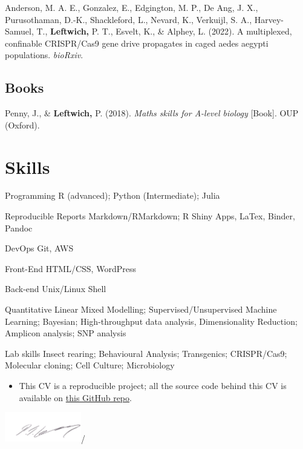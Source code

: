 \documentclass[11pt, a4paper]{awesome-cv}
\providecommand{\tightlist}{%
	\setlength{\itemsep}{0pt}\setlength{\parskip}{0pt}}
\begin{document}
\leavevmode\hypertarget{ref-1}{}%
Anderson, M. A. E., Gonzalez, E., Edgington, M. P., De Ang, J. X.,
Purusothaman, D.-K., Shackleford, L., Nevard, K., Verkuijl, S. A.,
Harvey-Samuel, T., \textbf{Leftwich,} P. T., Esvelt, K., \& Alphey, L.
(2022). A multiplexed, confinable CRISPR/Cas9 gene drive propagates in
caged aedes aegypti populations. \emph{bioRxiv}.

\endgroup

\hypertarget{books}{%
\subsection{Books}\label{books}}

\begingroup
\setlength{\parindent}{0.2in}

\hypertarget{refs_proceedings}{}
\leavevmode\hypertarget{ref-1}{}%
Penny, J., \& \textbf{Leftwich,} P. (2018). \emph{Maths skills for
{A-level} biology} {[}Book{]}. OUP (Oxford).

\endgroup

\newpage

\hypertarget{skills}{%
\section{Skills}\label{skills}}

\begin{cvskills}
  \cvskill
    {Programming}
    {R (advanced); Python (Intermediate); Julia}
    
  \cvskill
    {Reproducible Reports}
    {Markdown/RMarkdown; R Shiny Apps, LaTex, Binder, Pandoc}
   
  \cvskill
    {DevOps}
    {Git, AWS}  
    
  \cvskill
    {Front-End}
    {HTML/CSS, WordPress} 
    
  \cvskill
    {Back-end}
    {Unix/Linux Shell}
    
  \cvskill
    {Quantitative}
    {Linear Mixed Modelling; Supervised/Unsupervised Machine Learning; Bayesian; \newline High-throughput data analysis, Dimensionality Reduction; Amplicon analysis; SNP analysis}
    
  \cvskill
    {Lab skills}
    {Insect rearing; Behavioural Analysis; Transgenics; CRISPR/Cas9; Molecular cloning; \newline Cell Culture; Microbiology}
    
\end{cvskills}

\begin{itemize}
\tightlist
\item
  This CV is a reproducible project; all the source code behind this CV
  is available on \href{https://github.com/Philip-Leftwich/PL_CV}{this
  GitHub repo}.
\end{itemize}

\includegraphics[width=0.25\textwidth,height=0.1\textheight]{data/PL_sig.png}/
\end{document}
